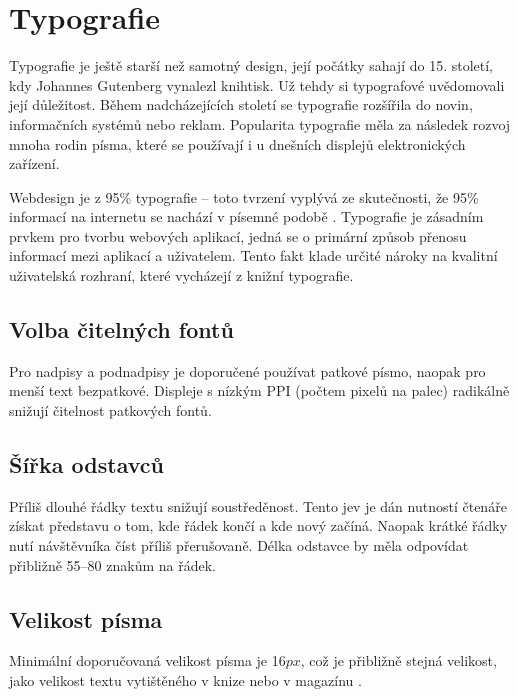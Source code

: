 \section{Typografie}
\label{sec:typografie}

\begin{quote}
     \cite{svalbach}
\end{quote}

\noindent
Typografie je ještě starší než samotný design, její počátky sahají do 15. století, kdy Johannes Gutenberg vynalezl knihtisk. Už tehdy si typografové uvědomovali její důležitost. Během nadcházejících století se typografie rozšířila do novin, informačních systémů nebo reklam. Popularita typografie měla za následek rozvoj mnoha rodin písma, které se používají i u dnešních displejů elektronických zařízení.

Webdesign je z 95\% typografie -- toto tvrzení vyplývá ze skutečnosti, že 95\% informací na internetu se nachází v písemné podobě \cite{typography}. Typografie je zásadním prvkem pro tvorbu webových aplikací, jedná se o primární způsob přenosu informací mezi aplikací a uživatelem. Tento fakt klade určité nároky na kvalitní uživatelská rozhraní, které vycházejí z knižní typografie.

\subsection{Volba čitelných fontů}

Pro nadpisy a podnadpisy je doporučené používat patkové písmo, naopak pro menší text bezpatkové. Displeje s nízkým PPI (počtem pixelů na palec) radikálně snižují čitelnost patkových fontů.

\subsection{Šířka odstavců}

Příliš dlouhé řádky textu snižují soustředěnost. Tento jev je dán nutností čtenáře získat představu o tom, kde řádek končí a kde nový začíná. Naopak krátké řádky nutí návštěvníka číst příliš přerušovaně. Délka odstavce by měla odpovídat přibližně 55--80 znakům na řádek.

\subsection{Velikost písma}

Minimální doporučovaná velikost písma je 16$px$, což je přibližně stejná velikost, jako velikost textu vytištěného v knize nebo v magazínu \cite{min-font-size}.

